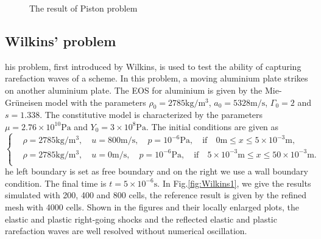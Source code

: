 \documentclass[review]{elsarticle}
\begin{document}
\begin{figure}
      \caption{ The result of Piston problem}
      \label{fig:piston1}
    \end{figure}

\subsection{Wilkins' problem}
his problem, first introduced by Wilkins, is used to test the  ability of capturing rarefaction waves of a scheme. In this problem, a moving aluminium plate strikes on another aluminium plate. The EOS for aluminium is given by the Mie-Gr\"uneisen model with the parameters $\rho_0 = 2785 \text{kg}/\text{m}^3$, $ a_0 = 5328 \text{m} /\text{s}$, $\Gamma_0 =2$ and $s = 1.338$. The constitutive model is characterized by the parameters $\mu = 2.76\times 10^{10} \text{Pa}$ and $Y_0 = 3\times 10^8 \text{Pa}$. The initial conditions are given as
\begin{equation}
 \left\{ \begin{aligned}
   &  \rho = 2785 \text{kg}/\text{m}^3, \quad  u = 800\text{m}/\text{s}, \quad  p = 10^{-6}\text{Pa}, \quad  \text{if} \quad  0\text{m} \le x \le 5\times 10^{-3} \text{m},\\
   &  \rho = 2785 \text{kg}/\text{m}^3, \quad  u = 0\text{m}/\text{s}, \quad  p = 10^{-6}\text{Pa}, \quad  \text{if}  \quad  5 \times 10^{-3}\text{m} \le x \le 50\times 10^{-3} \text{m}.\\
   \end{aligned}
 \right.
\end{equation}
he left boundary is set as free boundary and on  the right we use a wall boundary condition. The final time is $t =5\times 10^{-6} \text{s}$. In Fig.\ref{fig:Wilkins1}, we give the results  simulated with 200, 400 and 800 cells, the reference result is given by the refined mesh with 4000 cells. Shown in the figures and their locally enlarged plots, the elastic and plastic right-going shocks and the reflected elastic and plastic rarefaction waves are well resolved without numerical oscillation.
\end{document}
